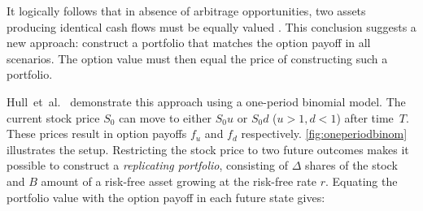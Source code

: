 \documentclass[english,12pt,a4paper,pdftex,sci,utf8]{aaltothesis}
\begin{document}
It logically follows that in absence of arbitrage opportunities, two assets producing identical cash flows must be equally valued \cite{hull2016options, wilmott2013paul}. This conclusion suggests a new approach: construct a portfolio that matches the option payoff in all scenarios. The option value must then equal the price of constructing such a portfolio.

Hull~et~al.~\cite{hull2013fundamentals} demonstrate this approach using a one-period binomial model. The current stock price $S_0$ can move to either $S_0u$ or $S_0d$ ($u>1,d<1$) after time~$T$. These prices result in option payoffs $f_u$ and $f_d$ respectively. \cref{fig:oneperiodbinom} illustrates the setup. Restricting the stock price to two future outcomes makes it possible to construct a \emph{replicating portfolio}, consisting of $\Delta$ shares of the stock and $B$ amount of a risk-free asset growing at the risk-free rate $r$. Equating the portfolio value with the option payoff in each future state gives:
\end{document}
